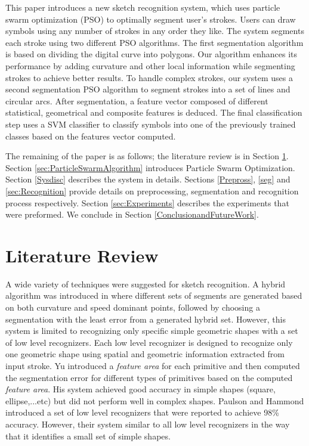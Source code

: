 \documentclass{article}
\begin{document}
This paper introduces a new sketch recognition system, which uses particle swarm optimization (PSO) to optimally segment user's strokes. Users can draw symbols using any number of strokes in any order they like. The system segments each stroke using two different PSO algorithms. The first segmentation algorithm is based on dividing the digital curve into polygons\cite{PolygonApproximationPSO}. Our algorithm enhances its performance by adding curvature and other local information while segmenting strokes to achieve better results. To handle complex strokes, our system uses a second segmentation PSO algorithm to segment strokes into a set of lines and circular arcs. After segmentation, a feature vector composed of different statistical, geometrical and composite features is deduced. The final classification step uses a SVM classifier to classify symbols into one of the previously trained classes based on the features vector computed. %

 The remaining of the paper is as follows; the literature review is in Section \ref{sec:review}. Section \ref{sec:ParticleSwarmAlgorithm} introduces Particle Swarm Optimization. Section \ref{Sysdisc} describes the system in details.  Sections \ref{Prepross}, \ref{seg} and \ref{sec:Recognition} provide details on preprocessing, segmentation and recognition process respectively. Section \ref{sec:Experiments} describes the experiments that were preformed. We conclude in Section \ref{ConclusionandFutureWork}.  

\section{Literature Review}
\label{sec:review}
A wide variety of techniques were suggested for sketch recognition.  A hybrid algorithm was introduced in \cite{earlyprocess} where different sets of segments are generated based on both curvature and speed dominant points, followed by choosing a segmentation with the least error from a generated hybrid set. However, this system is limited to recognizing only specific simple geometric shapes with a set of low level recognizers. Each low level recognizer is designed to recognize only one geometric shape using spatial and geometric information extracted from input stroke.  Yu \cite{meanshift10} introduced a \textit{feature area} for each primitive and then computed the segmentation error for different types of primitives based on the computed \textit{feature area}. His system achieved good accuracy in simple shapes (square, ellipse,...etc) but did not perform well in complex shapes. Paulson and Hammond \cite{Paleosketch08} introduced a set of low level recognizers that were reported to achieve 98\%   accuracy. However, their system similar to all low level recognizers in the way that it identifies a small set of simple shapes.%
\end{document}
